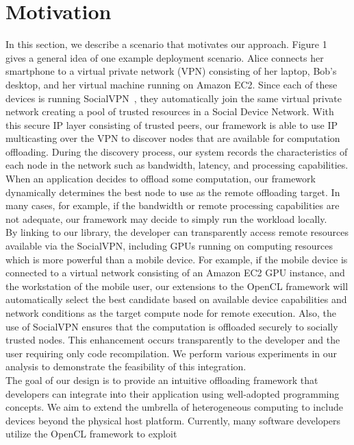 \documentclass[10pt, conference, compsocconf]{IEEEtran}
\begin{document}
\section{Motivation}
%
In this section, we describe a scenario that motivates our approach.
%
Figure 1 gives a general idea of one example deployment scenario.
%
Alice connects her smartphone to a virtual private network (VPN) consisting 
of her laptop, Bob's desktop, and her virtual machine running on Amazon EC2.
%
Since each of these devices is running SocialVPN~\cite{socialvpn}, they 
automatically join the same virtual private network creating a pool of trusted 
resources in a Social Device Network.
%
With this secure IP layer consisting of trusted peers, our framework is 
able to use IP multicasting over the VPN to discover nodes that are available 
for computation offloading.
%
During the discovery process, our system records the characteristics of each 
node in the network such as bandwidth, latency, and processing capabilities.
%
When an application decides to offload some computation, our framework 
dynamically determines the best node to use as the remote offloading target.
%
In many cases, for example, if the bandwidth or remote processing capabilities 
are not adequate, our framework may decide to simply run the workload
locally.\\
%
\indent By linking to our library, the developer can transparently access remote 
resources available via the SocialVPN, including GPUs running on computing
resources which is more powerful than a mobile 
device.
%
For example, if the mobile device is connected to a virtual network 
consisting of an Amazon EC2 GPU instance, and the workstation of the
mobile user, our extensions to the OpenCL framework will automatically 
select the best candidate based on available device capabilities and 
network conditions as the target compute node for remote execution.
%
Also, the use of SocialVPN ensures that the computation is offloaded securely
to socially trusted nodes.
%
This enhancement occurs transparently to the developer and the user 
requiring only code recompilation.
%
We perform various experiments in our analysis to demonstrate the 
feasibility of this integration.\\
%
\indent The goal of our design is to provide an intuitive offloading framework that 
developers can integrate into their application using well-adopted 
programming concepts.
%
We aim to extend the umbrella of heterogeneous computing to include devices
beyond the physical host platform.
%
Currently, many software developers utilize the OpenCL framework to exploit 
\end{document}
